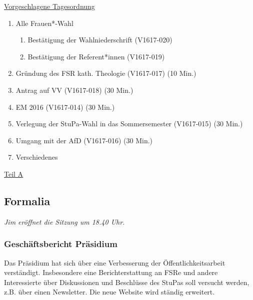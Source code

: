 \documentclass[ngerman,headheight=70pt]{scrartcl}
\begin{document}
    \newpage
    \underline{Vorgeschlagene Tagesordnung}
    \begin{enumerate}[label={\textbf{Top \theenumi}},leftmargin=*]
        \item Alle Frauen*-Wahl
            \begin{enumerate}
                \item Bestätigung der Wahlniederschrift (V1617-020)
                \item Bestätigung der Referent*innen (V1617-019)
            \end{enumerate}
        \item Gründung des FSR kath. Theologie (V1617-017) (10 Min.)
        \item Antrag auf VV (V1617-018) (30 Min.)
        \item EM 2016 (V1617-014) (30 Min.)
        \item Verlegung der StuPa-Wahl in das Sommersemester (V1617-015) (30 Min.)
        \item Umgang mit der AfD (V1617-016) (30 Min.)
        \item Verschiedenes
    \end{enumerate}

    \newpage


    {\Large \underline{Teil A}}

    \subsection{Formalia}

    \textit{Jim eröffnet die Sitzung um 18.40 Uhr.}

    \subsubsection{Geschäftsbericht Präsidium}

    Das Präsidium hat sich über eine Verbesserung der Öffentlichkeitsarbeit
    verständigt. Insbesondere eine Berichterstattung an FSRe und andere
    Interessierte über Diskussionen und Beschlüsse des StuPas soll versucht
    werden, z.B. über einen Newsletter. Die neue Website wird ständig erweitert.
\end{document}
